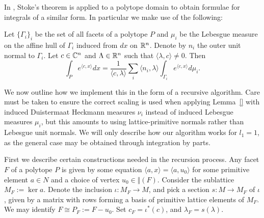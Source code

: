 In \cite{barvinok}, Stoke's theorem is applied to a polytope domain to obtain formulae for integrals of a similar form. In particular we make use of the following:
\begin{lemma} \label{lem:bar}
Let \(\{\Gamma_i\}_i\) be the set of all facets of a polytope \(P\) and \(\mu_i\) be the Lebesgue measure on the affine hull of \(\Gamma_i\) induced from \(dx\) on \(\mathbb{R}^n\). Denote by \(n_i\) the outer unit normal to \(\Gamma_i\). Let \(c \in \mathbb{C}^n\) and \(\Lambda \in \mathbb{R}^n\) such that \(\langle \lambda, c \rangle \neq 0\). Then
\begin{equation} \label{eq:barv}
\int_P e^{\langle c, x \rangle} dx = \frac{1}{\langle c , \lambda \rangle} \sum_i   \langle n_i, \lambda \rangle \int_{\Gamma_i} e^{\langle c, x \rangle} d \mu_i.
\end{equation}
\end{lemma}
We now outline how we implement this in the form of a recursive algorithm. Care must be taken to ensure the correct scaling is used when applying Lemma~\ref{} with induced Duistermaat Heckmann measures \(\nu_i\) instead of induced Lebesgue measures \(\mu_i\), but this amounts to using lattice-primitive normals rather than Lebesgue unit normals. We will only describe how our algorithm works for \(l_1 = 1\), as the general case may be obtained through integration by parts.

First we describe certain constructions needed in the recursion process. Any facet \(F\) of a polytope \(P\) is given by some equation \(\langle a, x \rangle = \langle a, u_0 \rangle \) for some primitive element \(a \in N\) and a choice of vertex \(u_0 \in \Vert(F)\). Consider the sublattice \(M_F := \ker a\). Denote the inclusion \(\iota:M_F \to M\), and pick a section \(s: M \to M_F\) of \(\iota\), given by a matrix with rows forming a basis of primitive lattice elements of \(M_F\). We may identify \(F \cong P_F := F - u_0\). Set \(c_F = \iota^*(c)\), and \(\lambda_F = s(\lambda)\).

